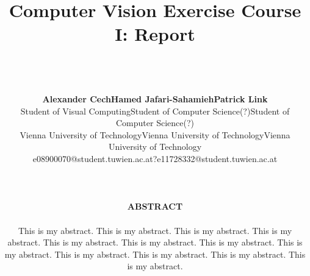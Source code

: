 \documentclass[a4paper,psfig,subfigure,epsfig,fleqn,ausarbeitung,amssmb,float,caption,fontenc]{article}
\begin{document}
\date{}

\title{%
  \fontsize{14}{14pt} \bf Computer Vision Exercise Course I: Report}

\author{~\\
  ~\\
  \fontsize{12}{12pt}
  \begin{tabular}[t]{c c c}
  {\bf Alexander Cech}                    & {\bf Hamed Jafari-Sahamieh}             & {\bf Patrick Link}                      \\
  \small{Student of Visual Computing}     & \small{Student of Computer Science(?)}  & \small{Student of Computer Science(?)}  \\
  \small{Vienna University of Technology} & \small{Vienna University of Technology} & \small{Vienna University of Technology} \\
  \small{e08900070@student.tuwien.ac.at}  & \small{?}                               & \small{e11728332@student.tuwien.ac.at}  \\
  \end{tabular}
  ~\\ ~\\ ~\\
  \normalsize
  {\bf ABSTRACT} \\ 
  \noindent
  \hspace{0.2cm}
  \begin{minipage}[c]{15cm}
  \normalsize This is my abstract.  This is my abstract.  This is my
    abstract.  This is my abstract.  This is my abstract.  This is my
    abstract.  This is my abstract.  This is my abstract.  This is my
    abstract.  This is my abstract.  This is my abstract.  This is my
    abstract.\\
  \end{minipage}
  \normalsize
  }

\maketitle

\normalfont
\thispagestyle{empty}
\end{document}
